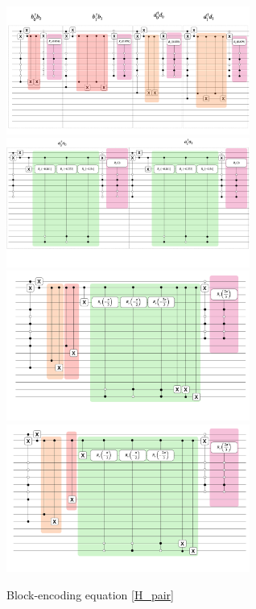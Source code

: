 \begin{figure}[h]
    \includegraphics[width = 8cm]{figures/fermi_free.png}
    \includegraphics[width = 8cm]{figures/bose_free.png}
    \includegraphics[width = 8cm]{figures/pair_create.png}
    \includegraphics[width = 8cm]{figures/pair_annihilate.png}
    \caption{Block-encoding equation \ref{H_pair}}
\end{figure}
